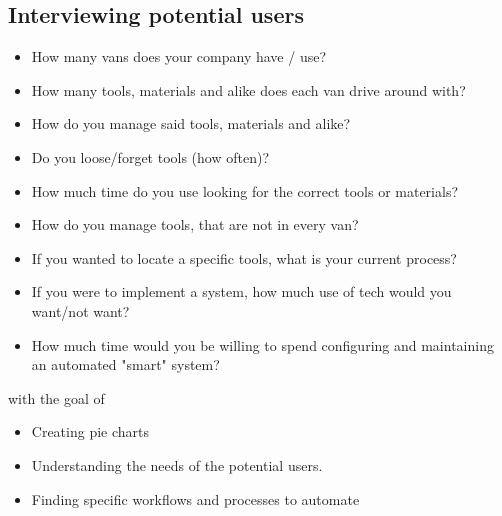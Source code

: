 \subsection{Interviewing potential users}

\begin{itemize}
    \item How many vans does your company have / use?
    \item How many tools, materials and alike does each van drive around with?
    \item How do you manage said tools, materials and alike?
    \item Do you loose/forget tools (how often)?
    \item How much time do you use looking for the correct tools or materials?
    \item How do you manage tools, that are not in every van?
    \item If you wanted to locate a specific tools, what is your current process?
    \item If you were to implement a system, how much use of tech would you want/not want?
    \item How much time would you be willing to spend configuring and maintaining an automated "smart" system?
\end{itemize}

with the goal of
\begin{itemize}
    \item Creating pie charts
    \item Understanding the needs of the potential users.
    \item Finding specific workflows and processes to automate
\end{itemize} 